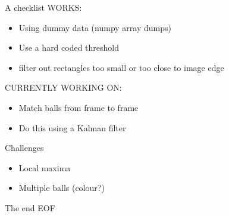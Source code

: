 \documentclass{beamer}
\begin{document}
\begin{frame}{A checklist}
WORKS:

\begin{itemize}
\item Using dummy data (numpy array dumps)\\
\item Use a hard coded threshold\\
\item filter out rectangles too small or too close to image edge
\end{itemize}

CURRENTLY WORKING ON:

\begin{itemize}
 \item Match balls from frame to frame
 \item Do this using a Kalman filter
\end{itemize}

\end{frame}



\begin{frame}{Challenges}
\begin{itemize}
	\item Local maxima
	\item Multiple balls (colour?)
\end{itemize}
\end{frame}

\begin{frame}{The end}
EOF
\end{frame}
\end{document}
